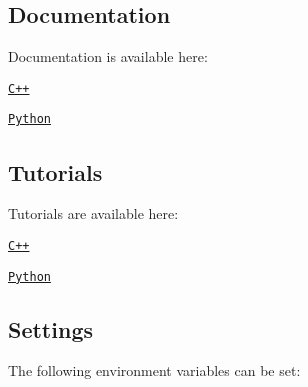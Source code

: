 \subsection*{Documentation}

Documentation is available here\+:


\begin{DoxyItemize}
\item \href{https://open-space-collective.github.io/open-space-toolkit-physics}{\tt C++}
\item \href{./bindings/python/docs}{\tt Python}
\end{DoxyItemize}

\subsection*{Tutorials}

Tutorials are available here\+:


\begin{DoxyItemize}
\item \href{./tutorials/cpp}{\tt C++}
\item \href{./tutorials/python}{\tt Python}
\end{DoxyItemize}

\subsection*{Settings}

The following environment variables can be set\+:

